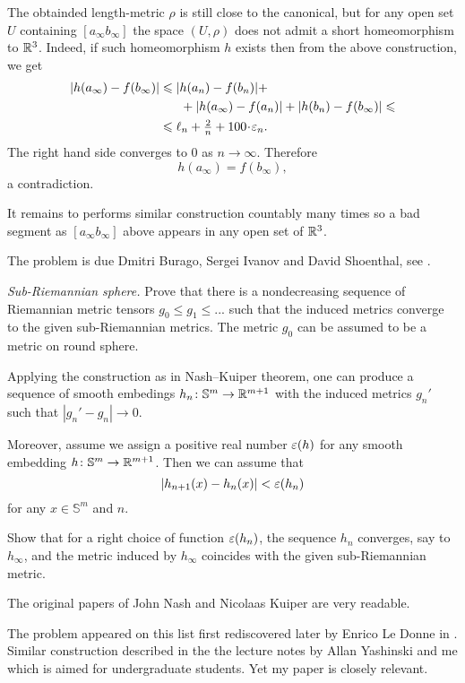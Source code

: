 The obtainded length-metric $\rho$ is still close to the canonical,
but for any open set $U$ containing $[a_\infty b_\infty]$
the space $(U,\rho)$ does not admit 
a short homeomorphism to $\mathbb{R}^3$.
Indeed, if such homeomorphism $h$
exists then 
from the above construction,
we get 
\begin{align*}
|h(a_\infty)-f(b_\infty)|
&\le 
|h(a_n)-f(b_n)|
+
\\
&\ \ \ \ \ +
|h(a_\infty)-f(a_n)|
+
|h(b_n)-f(b_\infty)|
\le
\\
&\le
\ell_n+\tfrac2n+100\cdot\eps_n.
\end{align*}
The right hand side converges to $0$ as $n\to\infty$.
Therefore 
\[h(a_\infty)=f(b_\infty),\] 
a contradiction.

It remains to performs similar construction countably many times so a bad segment as $[a_\infty b_\infty]$ above
appears in any open set of $\mathbb{R}^3$.


The problem is due
Dmitri Burago, 
Sergei Ivanov 
and David Shoenthal,
see \cite{BIS}.

\textit{Sub-Riemannian sphere.}
Prove that there is a nondecreasing sequence of Riemannian metric tensors
$g_0\le g_1\le ...$ such that the induced metrics converge to the given sub-Riemannian metrics.
The metric $g_0$ can be assumed to be a metric on round sphere.

Applying the construction as in Nash--Kuiper theorem,
one can produce a sequence of smooth embedings $h_n\colon\mathbb{S}^m\to \mathbb{R}^{m+1}$ with the induced metrics $g_n'$
such that $|g_n'-g_n|\to 0$.

Moreover, assume we assign a positive real number $\varepsilon(h)$ for any smooth embedding $h\colon\mathbb{S}^m\to\mathbb{R}^{m+1}$.
Then we can assume that 
\[|h_{n+1}(x)-h_n(x)|<\varepsilon(h_n)\] for any $x\in \mathbb{S}^m$ and $n$.

Show that for a right choice of function $\varepsilon(h_n)$,
the sequence $h_n$ converges, say to $h_\infty$, 
and the metric induced by $h_\infty$ coincides with the given sub-Riemannian metric.

The original papers of John Nash \cite{nash} 
and Nicolaas Kuiper \cite{kuiper} are very readable.

The problem appeared 
on this list first rediscovered later by Enrico Le Donne in \cite{le-donne}.
Similar construction described in the the lecture notes by Allan Yashinski and me \cite{petrunin-yashinsky} 
which is aimed for undergraduate students. 
Yet my paper \cite{petrunin-paths} is closely relevant.


